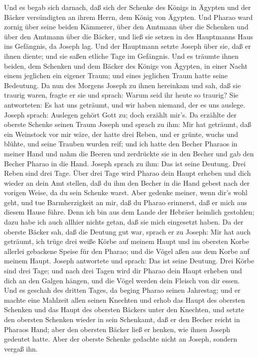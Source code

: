  Und es begab sich darnach, daß sich der Schenke des Königs
in Ägypten und der Bäcker versündigten an ihrem Herrn, dem König von
Ägypten.  Und Pharao ward zornig über seine beiden Kämmerer,
über den Amtmann über die Schenken und über den Amtmann über die Bäcker,
 und ließ sie setzen in des Hauptmanns Haus ins Gefängnis,
da Joseph lag.  Und der Hauptmann setzte Joseph über sie,
daß er ihnen diente; und sie saßen etliche Tage im Gefängnis.
 Und es träumte ihnen beiden, dem Schenken und dem Bäcker
des Königs von Ägypten, in einer Nacht einem jeglichen ein eigener
Traum; und eines jeglichen Traum hatte seine Bedeutung.  Da
nun des Morgens Joseph zu ihnen hereinkam und sah, daß sie traurig
waren,  fragte er sie und sprach: Warum seid ihr heute so
traurig?  Sie antworteten: Es hat uns geträumt, und wir
haben niemand, der es uns auslege. Joseph sprach: Auslegen gehört Gott
zu; doch erzählt mir's.  Da erzählte der oberste Schenke
seinen Traum Joseph und sprach zu ihm: Mir hat geträumt, daß ein
Weinstock vor mir wäre,  der hatte drei Reben, und er
grünte, wuchs und blühte, und seine Trauben wurden reif; 
und ich hatte den Becher Pharaos in meiner Hand und nahm die Beeren und
zerdrückte sie in den Becher und gab den Becher Pharao in die Hand.
 Joseph sprach zu ihm: Das ist seine Deutung. Drei Reben
sind drei Tage.  Über drei Tage wird Pharao dein Haupt
erheben und dich wieder an dein Amt stellen, daß du ihm den Becher in
die Hand gebest nach der vorigen Weise, da du sein Schenke warst.
 Aber gedenke meiner, wenn dir's wohl geht, und tue
Barmherzigkeit an mir, daß du Pharao erinnerst, daß er mich aus diesem
Hause führe.  Denn ich bin aus dem Lande der Hebräer
heimlich gestohlen; dazu habe ich auch allhier nichts getan, daß sie
mich eingesetzt haben.  Da der oberste Bäcker sah, daß die
Deutung gut war, sprach er zu Joseph: Mir hat auch geträumt, ich trüge
drei weiße Körbe auf meinem Haupt  und im obersten Korbe
allerlei gebackene Speise für den Pharao; und die Vögel aßen aus dem
Korbe auf meinem Haupt.  Joseph antwortete und sprach: Das
ist seine Deutung. Drei Körbe sind drei Tage;  und nach
drei Tagen wird dir Pharao dein Haupt erheben und dich an den Galgen
hängen, und die Vögel werden dein Fleisch von dir essen. 
Und es geschah des dritten Tages, da beging Pharao seinen Jahrestag; und
er machte eine Mahlzeit allen seinen Knechten und erhob das Haupt des
obersten Schenken und das Haupt des obersten Bäckers unter den Knechten,
 und setzte den obersten Schenken wieder in sein Schenkamt,
daß er den Becher reicht in Pharaos Hand;  aber den
obersten Bäcker ließ er henken, wie ihnen Joseph gedeutet hatte.
 Aber der oberste Schenke gedachte nicht an Joseph, sondern
vergaß ihn.

